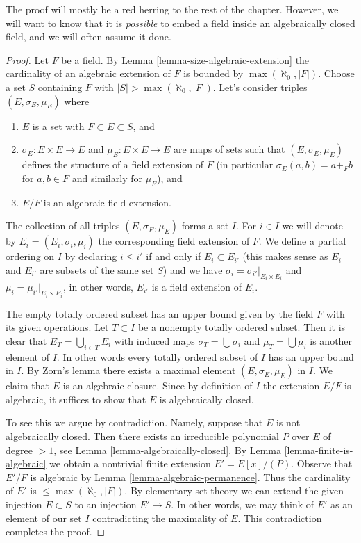 \noindent
The proof will mostly be a red herring to the rest of the chapter. However, we
will want to know that it is {\it possible} to embed a field inside an
algebraically closed field, and we will often assume it done.

\begin{proof}
Let $F$ be a field. By Lemma \ref{lemma-size-algebraic-extension} the
cardinality of an algebraic extension of $F$ is bounded by
$\max(\aleph_0, |F|)$. Choose a set $S$ containing $F$ with
$|S| > \max(\aleph_0, |F|)$. Let's consider triples
$(E, \sigma_E, \mu_E)$ where
\begin{enumerate}
\item $E$ is a set with $F \subset E \subset S$, and
\item $\sigma_E : E \times E \to E$ and $\mu_E : E \times E \to E$
are maps of sets such that $(E, \sigma_E, \mu_E)$ defines the structure
of a field extension of $F$ (in particular $\sigma_E(a, b) = a +_F b$
for $a, b \in F$ and similarly for $\mu_E$), and
\item $E/F$ is an algebraic field extension.
\end{enumerate}
The collection of all triples $(E, \sigma_E, \mu_E)$ forms a set $I$.
For $i \in I$ we will denote by $E_i = (E_i, \sigma_i, \mu_i)$ the
corresponding field extension of $F$. We define a partial ordering on
$I$ by declaring $i \leq i'$ if and only if $E_i \subset E_{i'}$
(this makes sense as $E_i$ and $E_{i'}$ are subsets of the same set $S$)
and we have $\sigma_i = \sigma_{i'}|_{E_i \times E_i}$ and
$\mu_i = \mu_{i'}|_{E_i \times E_i}$, in other words, $E_{i'}$ is a field
extension of $E_i$.

\medskip\noindent
The empty totally ordered subset has an upper bound given by the
field $F$ with its given operations. Let $T \subset I$ be a nonempty
totally ordered subset. Then it is clear that
$E_T = \bigcup_{i \in T} E_i$ with induced maps $\sigma_T = \bigcup \sigma_i$
and $\mu_T = \bigcup \mu_i$ is another element of $I$. In other words
every totally ordered subset of $I$ has an upper bound in $I$. By Zorn's lemma
there exists a maximal element $(E, \sigma_E, \mu_E)$ in $I$. We claim that
$E$ is an algebraic closure. Since by definition of $I$ the extension
$E/F$ is algebraic, it suffices to show that $E$ is algebraically closed.

\medskip\noindent
To see this we argue by contradiction. Namely, suppose that $E$ is not
algebraically closed. Then there exists an irreducible polynomial
$P$ over $E$ of degree $> 1$, see Lemma \ref{lemma-algebraically-closed}.
By Lemma \ref{lemma-finite-is-algebraic} we obtain a nontrivial finite
extension $E' = E[x]/(P)$. Observe that $E'/F$ is algebraic by
Lemma \ref{lemma-algebraic-permanence}.
Thus the cardinality of $E'$ is $\leq \max(\aleph_0, |F|)$.
By elementary set theory we can extend the given injection
$E \subset S$ to an injection $E' \to S$. In other words, we may
think of $E'$ as an element of our set $I$ contradicting the
maximality of $E$. This contradiction completes the proof.
\end{proof}

